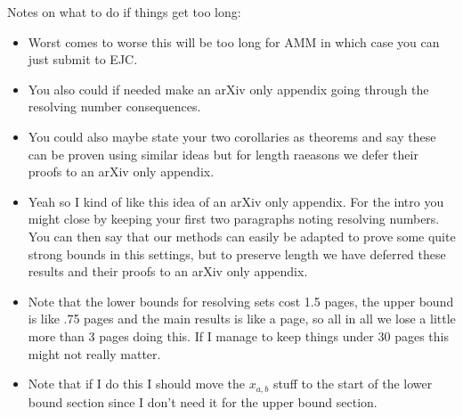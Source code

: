 \documentclass[12pt,letterpaper]{article}
\theoremstyle{definition}
\renewcommand{\1}{\mathbbm{1}}
\begin{document}
Notes on what to do if things get too long:
\begin{itemize}
	\item Worst comes to worse this will be too long for AMM in which case you can just submit to EJC.
	\item You also could if needed make an arXiv only appendix going through the resolving number consequences.
	\item You could also maybe state your two corollaries as theorems and say these can be proven using similar ideas but for length raeasons we defer their proofs to an arXiv only appendix.
	\item Yeah so I kind of like this idea of an arXiv only appendix.  For the intro you might close by keeping your first two paragraphs noting resolving numbers.  You can then say that our methods can easily be adapted to prove some quite strong bounds in this settings, but to preserve length we have deferred these results and their proofs to an arXiv only appendix.
	\item Note that the lower bounds for resolving sets cost 1.5 pages, the upper bound is like .75 pages and the main results is like a page, so all in all we lose a little more than 3 pages doing this.  If I manage to keep things under 30 pages this might not really matter.
	\item Note that if I do this I should move the $x_{a,b}$ stuff to the start of the lower bound section since I don't need it for the upper bound section.
\end{itemize}
\end{document}
